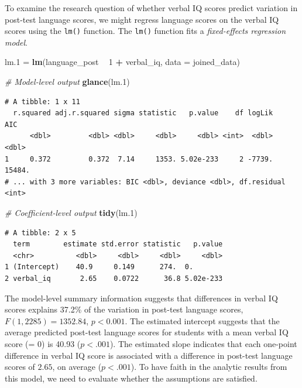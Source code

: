 \documentclass[]{book}
\newenvironment{Shaded}{\begin{snugshade}}{\end{snugshade}}
\newcommand{\CommentTok}[1]{\textcolor[rgb]{0.56,0.35,0.01}{\textit{#1}}}
\newcommand{\DataTypeTok}[1]{\textcolor[rgb]{0.13,0.29,0.53}{#1}}
\newcommand{\DecValTok}[1]{\textcolor[rgb]{0.00,0.00,0.81}{#1}}
\newcommand{\FloatTok}[1]{\textcolor[rgb]{0.00,0.00,0.81}{#1}}
\newcommand{\KeywordTok}[1]{\textcolor[rgb]{0.13,0.29,0.53}{\textbf{#1}}}
\newcommand{\NormalTok}[1]{#1}
\newcommand{\OperatorTok}[1]{\textcolor[rgb]{0.81,0.36,0.00}{\textbf{#1}}}
\newcommand{\StringTok}[1]{\textcolor[rgb]{0.31,0.60,0.02}{#1}}
\begin{document}
To examine the research question of whether verbal IQ scores predict variation in post-test language scores, we might regress language scores on the verbal IQ scores using the \texttt{lm()} function. The \texttt{lm()} function fits a \emph{fixed-effects regression model}.

\begin{Shaded}
\begin{Highlighting}[]
\NormalTok{lm}\FloatTok{.1}\NormalTok{ =}\StringTok{ }\KeywordTok{lm}\NormalTok{(language_post }\OperatorTok{~}\StringTok{ }\DecValTok{1} \OperatorTok{+}\StringTok{ }\NormalTok{verbal_iq, }\DataTypeTok{data =}\NormalTok{ joined_data)}

\CommentTok{# Model-level output}
\KeywordTok{glance}\NormalTok{(lm}\FloatTok{.1}\NormalTok{)}
\end{Highlighting}
\end{Shaded}

\begin{verbatim}
# A tibble: 1 x 11
  r.squared adj.r.squared sigma statistic   p.value    df logLik    AIC
      <dbl>         <dbl> <dbl>     <dbl>     <dbl> <int>  <dbl>  <dbl>
1     0.372         0.372  7.14     1353. 5.02e-233     2 -7739. 15484.
# ... with 3 more variables: BIC <dbl>, deviance <dbl>, df.residual <int>
\end{verbatim}

\begin{Shaded}
\begin{Highlighting}[]
\CommentTok{# Coefficient-level output}
\KeywordTok{tidy}\NormalTok{(lm}\FloatTok{.1}\NormalTok{)}
\end{Highlighting}
\end{Shaded}

\begin{verbatim}
# A tibble: 2 x 5
  term        estimate std.error statistic   p.value
  <chr>          <dbl>     <dbl>     <dbl>     <dbl>
1 (Intercept)    40.9     0.149      274.  0.       
2 verbal_iq       2.65    0.0722      36.8 5.02e-233
\end{verbatim}

The model-level summary information suggests that differences in verbal IQ scores explains 37.2\% of the variation in post-test language scores, \(F(1,2285)=1352.84\), \(p<0.001\). The estimated intercept suggests that the average predicted post-test language scores for students with a mean verbal IQ score (= 0) is 40.93 (\(p<.001\)). The estimated slope indicates that each one-point difference in verbal IQ score is associated with a difference in post-test language scores of \(2.65\), on average (\(p<.001\)). To have faith in the analytic results from this model, we need to evaluate whether the assumptions are satisfied.
\end{document}
